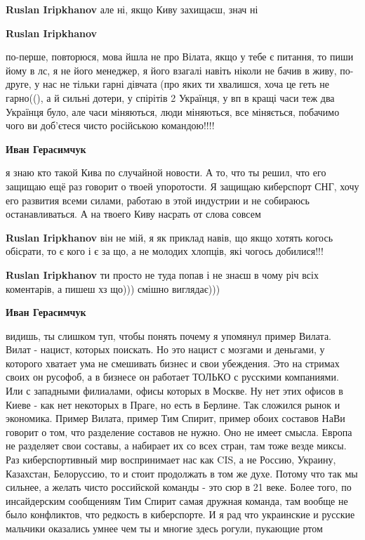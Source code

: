 \begin{itemize}
\begin{itemize}
\begin{itemize}
\textbf{Ruslan Iripkhanov} але ні, якщо Киву захищаєш, знач ні

\textbf{Ruslan Iripkhanov} 

по-перше, повторюся, мова йшла не про Вілата, якщо у тебе є питання, то пиши
йому в лс, я не його менеджер, я його взагалі навіть ніколи не бачив в живу,
по-друге, у нас не тільки гарні дівчата (про яких ти хвалишся, хоча це геть не
гарно((), а й сильні дотери, у спірітів 2 Українця, у вп в кращі часи теж два
Українця було, але часи міняються, люди міняються, все міняється, побачимо чого
ви доб'єтеся чисто російською командою!!!!


\textbf{Иван Герасимчук} 

я знаю кто такой Кива по случайной новости. А то, что ты решил, что его защищаю
ещё раз говорит о твоей упоротости. Я защищаю киберспорт СНГ, хочу его развития
всеми силами, работаю в этой индустрии и не собираюсь останавливаться. А на
твоего Киву насрать от слова совсем

\textbf{Ruslan Iripkhanov} він не мій, я як приклад навів, що якщо хотять когось обісрати, то є кого і є за що, а не молодих хлопців, які чогось добилися!!!

\textbf{Ruslan Iripkhanov} ти просто не туда попав і не знаєш в чому річ всіх коментарів, а пишеш хз що))) смішно виглядає)))

\textbf{Иван Герасимчук} 

видишь, ты слишком туп, чтобы понять почему я упомянул пример Вилата. Вилат -
нацист, которых поискать. Но это нацист с мозгами и деньгами, у которого
хватает ума не смешивать бизнес и свои убеждения. Это на стримах своих он
русофоб, а в бизнесе он работает ТОЛЬКО с русскими компаниями. Или с западными
филиалами, офисы которых в Москве. Ну нет этих офисов в Киеве - как нет
некоторых в Праге, но есть в Берлине. Так сложился рынок и экономика. Пример
Вилата, пример Тим Спирит, пример обоих составов НаВи говорит о том, что
разделение составов не нужно. Оно не имеет смысла. Европа не разделяет свои
составы, а набирает их со всех стран, там тоже везде миксы. Раз киберспортивный
мир воспринимает нас как CIS, а не Россию, Украину, Казахстан, Белоруссию, то и
стоит продолжать в том же духе. Потому что так мы сильнее, а желать чисто
российской команды - это сюр в 21 веке. Более того, по инсайдерским сообщениям
Тим Спирит самая дружная команда, там вообще не было конфликтов, что редкость в
киберспорте. И я рад что украинские и русские мальчики оказались умнее чем ты и
многие здесь рогули, пукающие ртом


\end{itemize}
\end{itemize}
\end{itemize}
